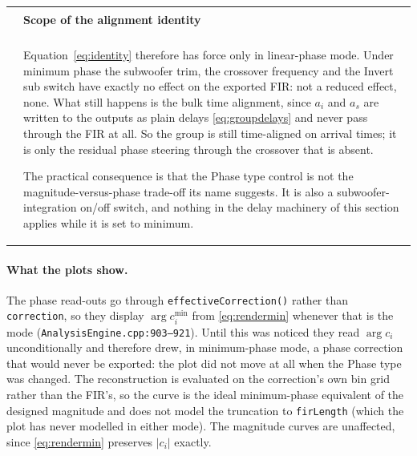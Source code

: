 \documentclass[11pt,a4paper]{article}
\makeatletter
\newcommand{\srcref}[2]{\texttt{\small #1}\discretionary{}{}{}\texttt{\small :#2}}
\newcommand{\code}[1]{\texttt{\small #1}}
\newenvironment{remark}[1]
  {\par\medskip\noindent\begin{tabular}{@{}p{0.03\textwidth}p{0.93\textwidth}@{}}
   \textcolor{smtblue}{\rule{2pt}{\baselineskip}} & \textbf{#1}\\[2pt] & \ignorespaces}
  {\end{tabular}\par\medskip}
\makeatother
\begin{document}
\begin{remark}{Scope of the alignment identity}
Equation~\eqref{eq:identity} therefore has force only in linear-phase mode. Under
minimum phase the subwoofer trim, the crossover frequency and the Invert sub
switch have exactly no effect on the exported FIR: not a reduced effect, none.
What still happens is the bulk time alignment, since $a_i$ and $a_s$ are written
to the outputs as plain delays \eqref{eq:groupdelays} and never pass through the
FIR at all. So the group is still time-aligned on arrival times; it is only the
residual phase steering through the crossover that is absent.

The practical consequence is that the Phase type control is not the
magnitude-versus-phase trade-off its name suggests. It is also a
subwoofer-integration on/off switch, and nothing in the delay machinery of this
section applies while it is set to minimum.
\end{remark}

\paragraph{What the plots show.} The phase read-outs go through
\code{effectiveCorrection()} rather than \code{correction}, so they display
$\arg c_i^{\min}$ from \eqref{eq:rendermin} whenever that is the mode
(\srcref{AnalysisEngine.cpp}{903--921}). Until this was noticed they read
$\arg c_i$ unconditionally and therefore drew, in minimum-phase mode, a phase
correction that would never be exported: the plot did not move at all when the
Phase type was changed. The reconstruction is evaluated on the correction's own
bin grid rather than the FIR's, so the curve is the ideal minimum-phase
equivalent of the designed magnitude and does not model the truncation to
\code{firLength} (which the plot has never modelled in either mode). The
magnitude curves are unaffected, since \eqref{eq:rendermin} preserves $|c_i|$
exactly.
\end{document}

